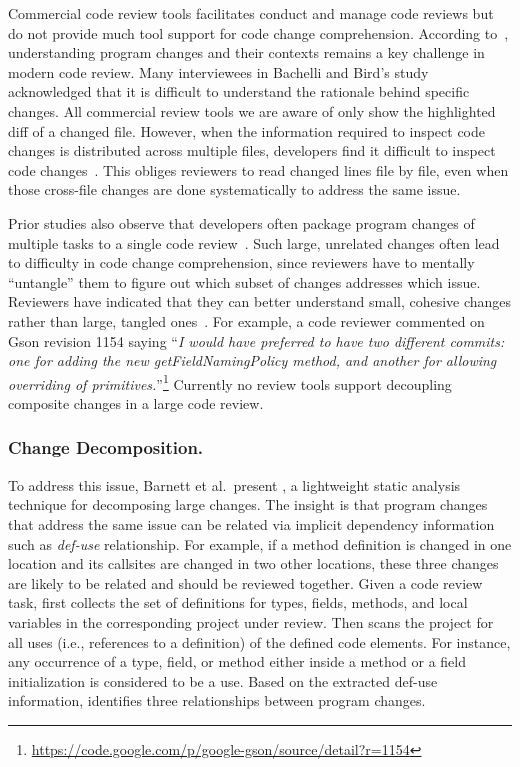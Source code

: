\documentclass[runningheads,a4paper]{llncs}
\begin{document}
Commercial code review tools facilitates conduct and manage code reviews but do not provide much tool support for code change comprehension. According to~\cite{bacchelli2013expectations}, understanding program changes and their contexts remains a key challenge in modern code review. Many interviewees in Bachelli and Bird's study acknowledged that it is difficult to understand the rationale behind specific changes. All commercial review tools we are aware of only show the highlighted diff of a changed file. However, when the information required to inspect code changes is distributed across multiple files, developers find it difficult to inspect code changes~\cite{Dunsmore2000:ooinspection}. This obliges reviewers to read changed lines file by file, even when those cross-file changes are done systematically to address the same issue. 

Prior studies also observe that developers often package program changes of multiple tasks to a single code review~\cite{Kawrykow2011,Murphy-Hill2012:refactor,herzig2013impact}. Such large, unrelated changes often lead to difficulty in code change comprehension, since reviewers have to mentally ``untangle'' them to figure out which subset of changes addresses which issue. Reviewers have indicated that they can better understand small, cohesive changes rather than large, tangled ones~\cite{Rigby2008:apache}. For example, a code reviewer commented on Gson revision 1154 saying ``{\em I would have preferred to have two different commits: one for adding the new {\ttt getFieldNamingPolicy} method, and another for allowing overriding of primitives.}''\footnote{\url{https://code.google.com/p/google-gson/source/detail?r=1154}} Currently no review tools support decoupling composite changes in a large code review. 
\subsubsection{Change Decomposition.}

To address this issue, Barnett et al.~present {\clusterchanges}, a lightweight static analysis technique for decomposing large changes. The insight is that program changes that address the same issue can be related via implicit dependency information such as {\em def-use} relationship. For example, if a method definition is changed in one location and its callsites are changed in two other locations, these three changes are likely to be related and should be reviewed together. Given a code review task, {\clusterchanges} first collects the set of definitions for types, fields, methods, and local variables in the corresponding project under review. Then {\clusterchanges} scans the project for all uses (i.e., references to a definition) of the defined code elements. For instance, any occurrence of a type, field, or method either inside a method or a field initialization is considered to be a use. Based on the extracted def-use information, {\clusterchanges} identifies three relationships between program changes. 
\end{document}
